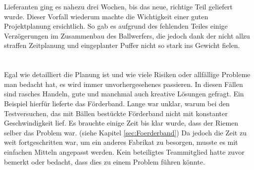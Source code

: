 Lieferanten ging es nahezu drei Wochen, bis das neue, richtige Teil geliefert wurde. Dieser Vorfall wiederum 
machte die Wichtigkeit einer guten Projektplanung ersichtlich. So gab es aufgrund des fehlenden Teiles einige 
Verzögerungen im Zusammenbau des Ballwerfers, die jedoch dank der nicht allzu straffen Zeitplanung und 
eingeplanter Puffer nicht so stark ins Gewicht fielen.\\
\\
\\ 
Egal wie detailliert die Planung ist und wie viele Risiken oder allfällige Probleme man bedacht hat, es wird immer unvorhergesehenes passieren. 
In diesen Fällen sind rasches Handeln, gute und manchmal auch kreative Lösungen gefragt. Ein Beispiel hierfür lieferte das Förderband.
Lange war unklar, warum bei den Testversuchen, das mit Bällen bestückte Förderband nicht mit konstanter Geschwindigkeit lief. 
Es brauchte einige Zeit bis klar wurde, dass der Riemen selber das Problem war. (siehe Kapitel \ref{sec:Foerderband})
Da jedoch die Zeit zu weit fortgeschritten war, um ein anderes Fabrikat zu besorgen, musste es mit einfachen Mitteln angepasst werden. 
Kein beteiligtes Teammitglied hatte zuvor bemerkt oder bedacht, dass dies zu einem Problem führen könnte. 
